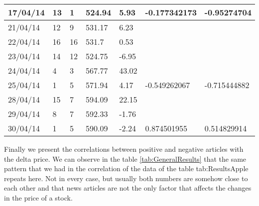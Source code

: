 \begin{table}
\begin{tabular}{ | p{1.8cm\textwidth} | p{1cm\textwidth} | p{1cm\textwidth} | p{1.1cm\textwidth} | p{1.1cm\textwidth} | p{2.5cm\textwidth} | p{2.5cm\textwidth} |}
17/04/14 & 13   & 1    & 524.94 & 5.93         & -0.177342173       & -0.95274704         \\\hline
21/04/14 & 12   & 9    & 531.17 & 6.23         &                    &                     \\\hline
22/04/14 & 16   & 16   & 531.7  & 0.53         &                    &                     \\\hline
23/04/14 & 14   & 12   & 524.75 & -6.95        &                    &                     \\\hline
24/04/14 & 4    & 3    & 567.77 & 43.02        &                    &                     \\\hline
25/04/14 & 1    & 5    & 571.94 & 4.17         & -0.549262067       & -0.715444882        \\\hline
28/04/14 & 15   & 7    & 594.09 & 22.15        &                    &                     \\\hline
29/04/14 & 8    & 7    & 592.33 & -1.76        &                    &                     \\\hline
30/04/14 & 1    & 5    & 590.09 & -2.24        & 0.874501955        & 0.514829914    \\\hline    

    \end{tabular}
\end{table}

Finally we present the correlations between positive and negative articles with the delta price. We can observe in the table \ref{tab:GeneralResults} that the same pattern that we had in the correlation of the data of the table {tab:ResultsApple} repeats here. Not in every case, but usually both numbers are somehow close to each other and that news articles are not the only factor that affects the changes in the price of a stock.

